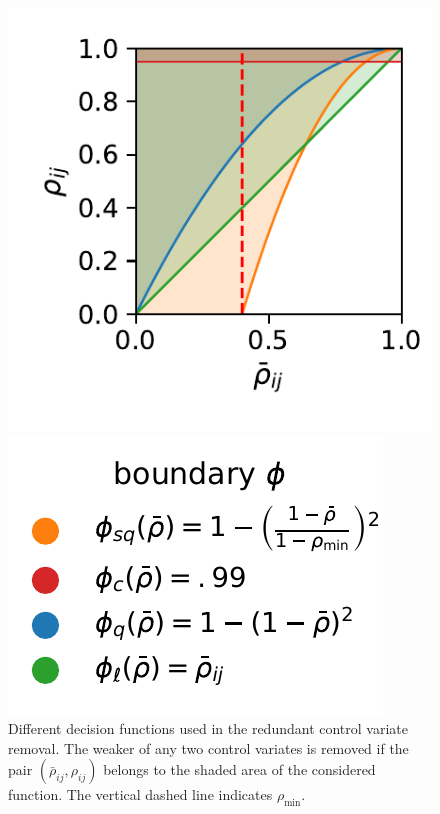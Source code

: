 \begin{figure}[htb]
    \centering
    \begin{minipage}{.6\textwidth}
    \centering
    \includegraphics[scale=.6]{gfx/decision_funcs.pdf}
    \end{minipage}
    \hspace{-2.8em}
    \begin{minipage}{.3\textwidth}
    \includegraphics[scale=.6]{gfx/legend_1.pdf} \vfill
    \end{minipage}
	\caption[\ac{CV} redundancy heuristics]{Different decision functions
    used in the redundant control  variate removal. The weaker of any two control  variates is removed if
    the pair $(\bar\rho_{ij}, \rho_{ij})$ belongs to the shaded area of the considered function.
    The vertical dashed line indicates $\rho_{\min}$.\label{fig:decision}}
\end{figure}


